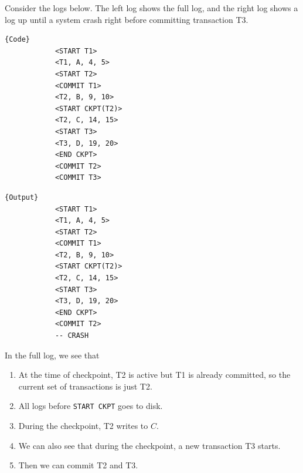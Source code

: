 \documentclass{article}
\begin{document}
      \begin{example}
        Consider the logs below. The left log shows the full log, and the right log shows a log up until a system crash right before committing transaction T3. 
        
        \noindent\begin{minipage}{.5\textwidth}
          \begin{lstlisting}[]{Code}
            <START T1>
            <T1, A, 4, 5>
            <START T2>
            <COMMIT T1>
            <T2, B, 9, 10>
            <START CKPT(T2)>
            <T2, C, 14, 15>
            <START T3>
            <T3, D, 19, 20>
            <END CKPT>
            <COMMIT T2>
            <COMMIT T3>
          \end{lstlisting}
          \end{minipage}
          \hfill
          \begin{minipage}{.49\textwidth}
          \begin{lstlisting}[]{Output}
            <START T1>
            <T1, A, 4, 5>
            <START T2>
            <COMMIT T1>
            <T2, B, 9, 10>
            <START CKPT(T2)>
            <T2, C, 14, 15>
            <START T3>
            <T3, D, 19, 20>
            <END CKPT>
            <COMMIT T2>
            -- CRASH
          \end{lstlisting}
        \end{minipage}

        In the full log, we see that 
        \begin{enumerate}
          \item At the time of checkpoint, T2 is active but T1 is already committed, so the current set of transactions is just T2. 
          \item All logs before \texttt{START CKPT} goes to disk. 
          \item During the checkpoint, T2 writes to $C$. 
          \item We can also see that during the checkpoint, a new transaction T3 starts. 
          \item Then we can commit T2 and T3. 
        \end{enumerate}


\end{example}
\end{document}
